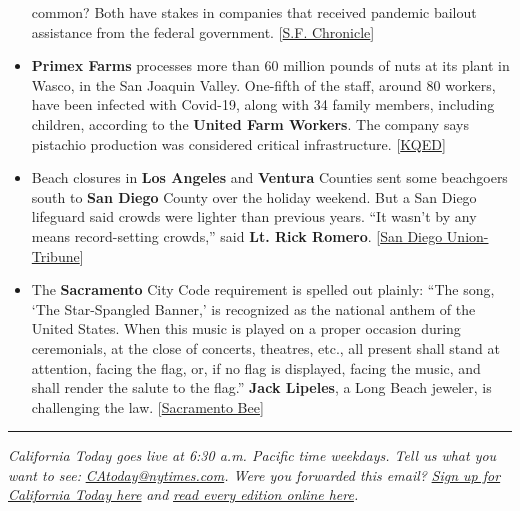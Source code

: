 \begin{itemize}
  common? Both have stakes in companies that received pandemic bailout
  assistance from the federal government.
  {[}\href{https://www.sfgate.com/news/article/The-Latest-Treasury-identifies-recipients-of-15388720.php}{S.F.
  Chronicle}{]}
\item
  \textbf{Primex Farms} processes more than 60 million pounds of nuts at
  its plant in Wasco, in the San Joaquin Valley. One-fifth of the staff,
  around 80 workers, have been infected with Covid-19, along with 34
  family members, including children, according to the \textbf{United
  Farm Workers}. The company says pistachio production was considered
  critical infrastructure.
  {[}\href{https://www.kqed.org/news/11827498/dozens-of-pistachio-plant-workers-infected-with-covid-19}{KQED}{]}
\item
  Beach closures in \textbf{Los Angeles} and \textbf{Ventura} Counties
  sent some beachgoers south to \textbf{San Diego} County over the
  holiday weekend. But a San Diego lifeguard said crowds were lighter
  than previous years. ``It wasn't by any means record-setting crowds,''
  said \textbf{Lt. Rick Romero}.
  {[}\href{https://www.sandiegouniontribune.com/local/story/2020-07-05/lifeguards-holiday-crowds-were-comparable-to-previous-fourth-of-july-weekends}{San
  Diego Union-Tribune}{]}
\item
  The \textbf{Sacramento} City Code requirement is spelled out plainly:
  ``The song, `The Star-Spangled Banner,' is recognized as the national
  anthem of the United States. When this music is played on a proper
  occasion during ceremonials, at the close of concerts, theatres, etc.,
  all present shall stand at attention, facing the flag, or, if no flag
  is displayed, facing the music, and shall render the salute to the
  flag.'' \textbf{Jack Lipeles}, a Long Beach jeweler, is challenging
  the law.
  {[}\href{https://www.sacbee.com/news/local/article244028592.html}{Sacramento
  Bee}{]}
\end{itemize}

\begin{center}\rule{0.5\linewidth}{\linethickness}\end{center}

\emph{California Today goes live at 6:30 a.m. Pacific time weekdays.
Tell us what you want to see:}
\href{mailto:CAtoday@nytimes.com}{\emph{CAtoday@nytimes.com}}\emph{.
Were you forwarded this email?}
\href{https://www.nytimes.com/newsletters/california-today?module=inline}{\emph{Sign
up for California Today here}} \emph{and}
\href{https://www.nytimes.com/column/california-today}{\emph{read every
edition online here}}\emph{.}

